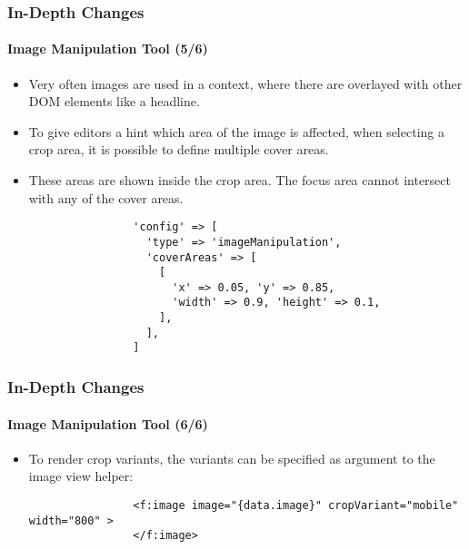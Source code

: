 
\begin{frame}[fragile]
	\frametitle{In-Depth Changes}
	\framesubtitle{Image Manipulation Tool (5/6)}

	\lstset{basicstyle=\tiny\ttfamily}

	\begin{itemize}
		\item Very often images are used in a context, where there are overlayed with other DOM elements like a headline.
		\item To give editors a hint which area of the image is affected, when selecting a crop area,
			it is possible to define multiple cover areas.
		\item These areas are shown inside the crop area. The focus area cannot intersect with any of the cover areas.

			\begin{lstlisting}
				'config' => [
				  'type' => 'imageManipulation',
				  'coverAreas' => [
				    [
				      'x' => 0.05, 'y' => 0.85,
				      'width' => 0.9, 'height' => 0.1,
				    ],
				  ],
				]
			\end{lstlisting}

	\end{itemize}

\end{frame}


\begin{frame}[fragile]
	\frametitle{In-Depth Changes}
	\framesubtitle{Image Manipulation Tool (6/6)}

	\lstset{basicstyle=\smaller\ttfamily}

	\begin{itemize}
		\item To render crop variants, the variants can be specified as argument to the image view helper:

			\begin{lstlisting}
				<f:image image="{data.image}" cropVariant="mobile" width="800" >
				</f:image>
			\end{lstlisting}

	\end{itemize}

\end{frame}

